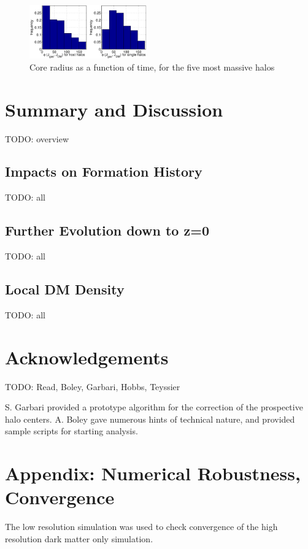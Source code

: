 \documentclass[useAMS,usenatbib]{mn2e}
\begin{document}
\begin{figure}
  \begin{center}
    \includegraphics[width=0.45\textwidth]{fig/a.eps}%
  \end{center}
  \caption{\label{fig:corerad_temp}Core radius as a function of time, for the five most massive halos}
\end{figure}


%
\section{Summary and Discussion}
\label{sec:sum}
%
TODO: overview
\subsection{Impacts on Formation History}
TODO: all

\subsection{Further Evolution down to z=0}
TODO: all

\subsection{Local DM Density}
TODO: all
%
%
\section*{Acknowledgements}
\label{sec:ack}
%
TODO: Read, Boley, Garbari, Hobbs, Teyssier

S. Garbari provided a prototype algorithm for the correction of the
prospective halo centers.  A. Boley gave numerous hints of technical
nature, and provided sample scripts for starting analysis.
%
\section{Appendix: Numerical Robustness, Convergence}
\label{sec:app}

The low resolution simulation was used to check convergence of the high resolution dark matter only simulation.
\end{document}
